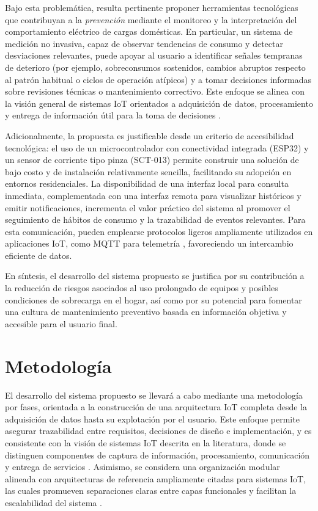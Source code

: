 ﻿\documentclass[12pt,openright,oneside]{report}
\theoremstyle{mytheoremstyle}
\theoremstyle{mytheoremstyle}
\theoremstyle{myproblemstyle}
\begin{document}
Bajo esta problemática, resulta pertinente proponer herramientas tecnológicas que contribuyan a la \textit{prevención} mediante el monitoreo y la interpretación del comportamiento eléctrico de cargas domésticas. En particular, un sistema de medición no invasiva, capaz de observar tendencias de consumo y detectar desviaciones relevantes, puede apoyar al usuario a identificar señales tempranas de deterioro (por ejemplo, sobreconsumos sostenidos, cambios abruptos respecto al patrón habitual o ciclos de operación atípicos) y a tomar decisiones informadas sobre revisiones técnicas o mantenimiento correctivo. Este enfoque se alinea con la visión general de sistemas IoT orientados a adquisición de datos, procesamiento y entrega de información útil para la toma de decisiones \cite{nist-sp800-183}.

Adicionalmente, la propuesta es justificable desde un criterio de accesibilidad tecnológica: el uso de un microcontrolador con conectividad integrada (ESP32) y un sensor de corriente tipo pinza (SCT-013) permite construir una solución de bajo costo y de instalación relativamente sencilla, facilitando su adopción en entornos residenciales. La disponibilidad de una interfaz local para consulta inmediata, complementada con una interfaz remota para visualizar históricos y emitir notificaciones, incrementa el valor práctico del sistema al promover el seguimiento de hábitos de consumo y la trazabilidad de eventos relevantes. Para esta comunicación, pueden emplearse protocolos ligeros ampliamente utilizados en aplicaciones IoT, como MQTT para telemetría \cite{mqtt-oasis}, favoreciendo un intercambio eficiente de datos.

En síntesis, el desarrollo del sistema propuesto se justifica por su contribución a la reducción de riesgos asociados al uso prolongado de equipos y posibles condiciones de sobrecarga en el hogar, así como por su potencial para fomentar una cultura de mantenimiento preventivo basada en información objetiva y accesible para el usuario final.

\section{Metodología}
\label{subsec:metodologia}

El desarrollo del sistema propuesto se llevará a cabo mediante una metodología por fases, orientada a la construcción de una arquitectura IoT completa desde la adquisición de datos hasta su explotación por el usuario. Este enfoque permite asegurar trazabilidad entre requisitos, decisiones de diseño e implementación, y es consistente con la visión de sistemas IoT descrita en la literatura, donde se distinguen componentes de captura de información, procesamiento, comunicación y entrega de servicios \cite{nist-sp800-183}. Asimismo, se considera una organización modular alineada con arquitecturas de referencia ampliamente citadas para sistemas IoT, las cuales promueven separaciones claras entre capas funcionales y facilitan la escalabilidad del sistema \cite{iota-arm-2013}.
\end{document}
